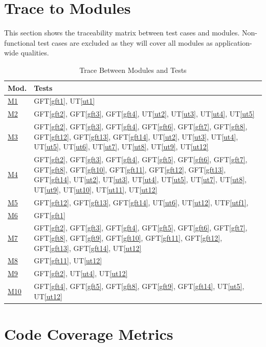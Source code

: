 \documentclass[12pt, titlepage]{article}
\begin{document}
\section{Trace to Modules}
This section shows the traceability matrix between test cases and modules. Non-functional test cases are excluded as they will cover all modules as application-wide qualities.		

\begin{table}[H]
\centering
\begin{tabular}{p{} p{}}
\toprule
\textbf{Mod.} & \textbf{Tests}\\
\midrule
\href{../Design/MG/MG.pdf#m1}{M1} & GFT\ref{gft1}, UT\ref{ut1}\\
\href{../Design/MG/MG.pdf#m2}{M2} & GFT\ref{gft2}, GFT\ref{gft3}, GFT\ref{gft4},  UT\ref{ut2},  UT\ref{ut3},  UT\ref{ut4},  UT\ref{ut5}\\
\href{../Design/MG/MG.pdf#m3}{M3} & GFT\ref{gft2}, GFT\ref{gft3}, GFT\ref{gft4}, GFT\ref{gft6}, GFT\ref{gft7}, GFT\ref{gft8}, GFT\ref{gft12}, GFT\ref{gft13}, GFT\ref{gft14}, UT\ref{ut2}, UT\ref{ut3}, UT\ref{ut4}, UT\ref{ut5}, UT\ref{ut6}, UT\ref{ut7}, UT\ref{ut8}, UT\ref{ut9}, UT\ref{ut12}\\
\href{../Design/MG/MG.pdf#m4}{M4} & GFT\ref{gft2}, GFT\ref{gft3}, GFT\ref{gft4}, GFT\ref{gft5}, GFT\ref{gft6}, GFT\ref{gft7}, GFT\ref{gft8}, GFT\ref{gft10}, GFT\ref{gft11}, GFT\ref{gft12}, GFT\ref{gft13}, GFT\ref{gft14}, UT\ref{ut2}, UT\ref{ut3}, UT\ref{ut4}, UT\ref{ut5}, UT\ref{ut7}, UT\ref{ut8}, UT\ref{ut9}, UT\ref{ut10}, UT\ref{ut11}, UT\ref{ut12}\\
\href{../Design/MG/MG.pdf#m5}{M5} & GFT\ref{gft12}, GFT\ref{gft13}, GFT\ref{gft14}, UT\ref{ut6}, UT\ref{ut12}, UTF\ref{utf1},\\
\href{../Design/MG/MG.pdf#m6}{M6} & GFT\ref{gft1}\\
\href{../Design/MG/MG.pdf#m7}{M7} & GFT\ref{gft2}, GFT\ref{gft3}, GFT\ref{gft4}, GFT\ref{gft5}, GFT\ref{gft6}, GFT\ref{gft7}, GFT\ref{gft8}, GFT\ref{gft9}, GFT\ref{gft10}, GFT\ref{gft11}, GFT\ref{gft12}, GFT\ref{gft13}, GFT\ref{gft14}, UT\ref{ut12}\\
\href{../Design/MG/MG.pdf#m8}{M8} & GFT\ref{gft11}, UT\ref{ut12}\\
\href{../Design/MG/MG.pdf#m9}{M9} & GFT\ref{gft2}, UT\ref{ut4}, UT\ref{ut12}\\
\href{../Design/MG/MG.pdf#m10}{M10} & GFT\ref{gft4}, GFT\ref{gft5}, GFT\ref{gft8}, GFT\ref{gft9}, GFT\ref{gft14}, UT\ref{ut5}, UT\ref{ut12}\\
\bottomrule
\end{tabular}
\caption{Trace Between Modules and Tests}
\label{TblMT}
\end{table}

\section{Code Coverage Metrics}

%

%
\end{document}
